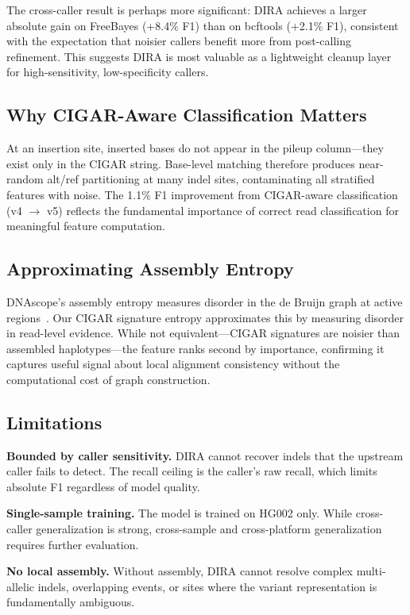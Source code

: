 \documentclass[sigconf]{acmart}
\begin{document}
The cross-caller result is perhaps more significant: DIRA achieves a larger absolute gain on FreeBayes (+8.4\% F1) than on bcftools (+2.1\% F1), consistent with the expectation that noisier callers benefit more from post-calling refinement. This suggests DIRA is most valuable as a lightweight cleanup layer for high-sensitivity, low-specificity callers.

\subsection{Why CIGAR-Aware Classification Matters}
At an insertion site, inserted bases do not appear in the pileup column---they exist only in the CIGAR string. Base-level matching therefore produces near-random alt/ref partitioning at many indel sites, contaminating all stratified features with noise. The 1.1\% F1 improvement from CIGAR-aware classification (v4 $\to$ v5) reflects the fundamental importance of correct read classification for meaningful feature computation.

\subsection{Approximating Assembly Entropy}
DNAscope's assembly entropy measures disorder in the de Bruijn graph at active regions~\cite{freed2022dnascope}. Our CIGAR signature entropy approximates this by measuring disorder in read-level evidence. While not equivalent---CIGAR signatures are noisier than assembled haplotypes---the feature ranks second by importance, confirming it captures useful signal about local alignment consistency without the computational cost of graph construction.

\subsection{Limitations}
\textbf{Bounded by caller sensitivity.} DIRA cannot recover indels that the upstream caller fails to detect. The recall ceiling is the caller's raw recall, which limits absolute F1 regardless of model quality.

\textbf{Single-sample training.} The model is trained on HG002 only. While cross-caller generalization is strong, cross-sample and cross-platform generalization requires further evaluation.

\textbf{No local assembly.} Without assembly, DIRA cannot resolve complex multi-allelic indels, overlapping events, or sites where the variant representation is fundamentally ambiguous.
\end{document}

